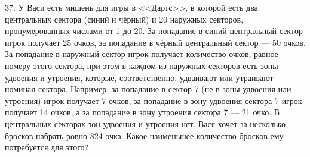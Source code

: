 37. У Васи есть мишень для игры в <<Дартс>>, в которой есть два центральных сектора (синий и чёрный) и 20 наружных секторов, пронумерованных числами от 1 до 20. За попадание в синий центральный сектор игрок получает 25 очков, за попадание в чёрный центральный сектор --- 50 очков. За попадание в наружный сектор игрок получает количество очков, равное номеру этого сектора, при этом в каждом из наружных секторов есть зоны удвоения и утроения, которые, соответственно, удваивают или утраивают номинал сектора. Например, за попадание в сектор 7 (не в зоны удвоения или утроения) игрок получает 7 очков, за попадание в зону удвоения сектора 7 игрок получает 14 очков, а за попадание в зону утроения сектора 7 --- 21 очко. В центральных секторах зон удвоения и утроения нет. Вася хочет за несколько бросков набрать ровно 824 очка. Какое наименьшее количество бросков ему потребуется для этого?\\
